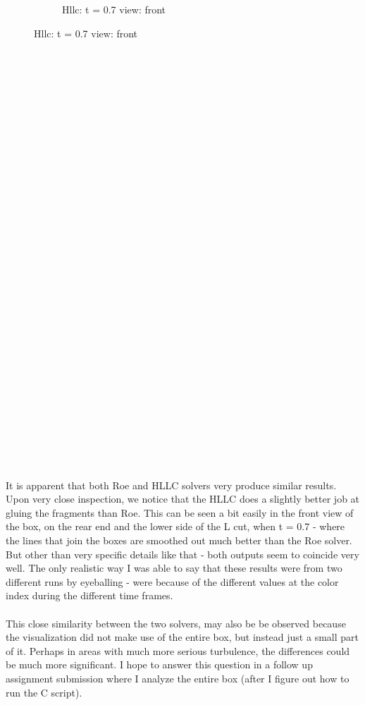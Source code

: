 \documentclass[12pt]{article}
\begin{document}
\begin{figure}[h]
\begin{subfigure}[h]{0.4500\textwidth}
	\caption{Hllc: t = 0.7 view: front}
\end{subfigure}
\end{figure}\\\\\\\\\\\\\\\\\\\\\\\\\\\\\\\\\\\\\\\\\\\\\\\\\\\\\\\\\\\\\\
It is apparent that both Roe and HLLC solvers very produce similar results. Upon very close inspection, we notice that the HLLC does a slightly better job at gluing the fragments than Roe. This can be seen a bit easily in the front view of the box, on the rear end and the lower side of the L cut, when t = 0.7 - where the lines that join the boxes are smoothed out much better than the Roe solver. But other than very specific details like that - both outputs seem to coincide very well. The only realistic way I was able to say that these results were from two different runs by eyeballing - were because of the different values at the color index during the different time frames.  \\\\
This close similarity between the two solvers, may also be be observed because the visualization did not make use of the entire box, but instead just a small part of it. Perhaps in areas with much more serious turbulence, the differences could be much more significant. I hope to answer this question in a follow up assignment submission where I analyze the entire box (after I figure out how to run the C script). 
\end{document}
